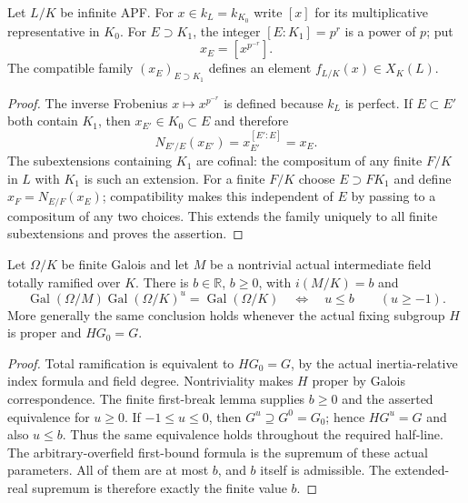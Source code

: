 \begin{definition}
\label{fw:residue-constants}
\leanok
Let $L/K$ be infinite APF. For $x\in k_L=k_{K_0}$ write $[x]$ for its
multiplicative representative in $K_0$.
For $E\supset K_1$, the integer $[E:K_1]=p^r$ is a power of $p$;
put
\[
 x_E=[x^{p^{-r}}].
\]
The compatible family $(x_E)_{E\supset K_1}$ defines an element
$f_{L/K}(x)\in X_K(L)$.
\end{definition}
\begin{proof}
The inverse Frobenius $x\mapsto x^{p^{-r}}$ is defined because $k_L$ is
perfect. If $E\subset E'$ both contain $K_1$, then $x_{E'}\in K_0\subset E$
and therefore
\[
 N_{E'/E}(x_{E'})=x_{E'}^{[E':E]}=x_E.
\]
The subextensions containing $K_1$ are cofinal: the compositum of any
finite $F/K$ in $L$ with $K_1$ is such an extension.
For a finite $F/K$ choose $E\supset F K_1$ and define
$x_F=N_{E/F}(x_E)$; compatibility makes this independent of $E$ by passing
to a compositum of any two choices. This extends the family uniquely to
all finite subextensions and proves the assertion.
\end{proof}

\begin{lemma}
\label{fw:finite-totally-ramified-first-bound}
\leanok
Let $\Omega/K$ be finite Galois and let $M$ be a nontrivial
actual intermediate field totally ramified over $K$. There is
$b\in\mathbb R$, $b\geq0$, with $i(M/K)=b$ and
\[
 \operatorname{Gal}(\Omega/M)\operatorname{Gal}(\Omega/K)^u
   =\operatorname{Gal}(\Omega/K)\quad\Longleftrightarrow\quad u\leq b
 \qquad(u\geq-1).
\]
More generally the same conclusion holds whenever the actual
fixing subgroup $H$ is proper and $HG_0=G$.
\end{lemma}
\begin{proof}
Total ramification is equivalent to $HG_0=G$, by the actual
inertia-relative index formula and field degree. Nontriviality
makes $H$ proper by Galois correspondence. The finite first-break
lemma supplies $b\geq0$ and the asserted equivalence for $u\geq0$.
If $-1\leq u\leq0$, then $G^u\supseteq G^0=G_0$; hence
$HG^u=G$ and also $u\leq b$. Thus the same equivalence holds
throughout the required half-line. The arbitrary-overfield
first-bound formula is the supremum of these actual parameters.
All of them are at most $b$, and $b$ itself is admissible.
The extended-real supremum is therefore exactly the finite value $b$.
\end{proof}

